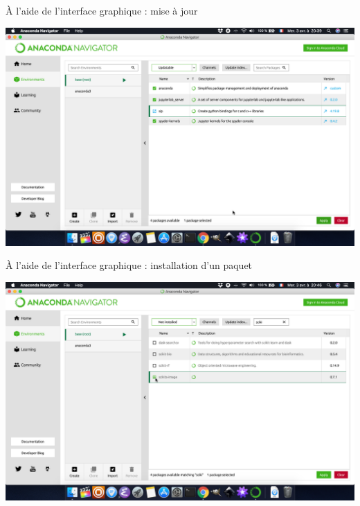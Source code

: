 \documentclass[10pt,aspectratio=169]{beamer}
\begin{document}
\begin{frame}{À l'aide de l'interface graphique : mise à jour}
  \begin{center}
    \includegraphics[height = .8\textheight]{anaconda-navigator-apply-upgrade}
  \end{center}
\end{frame}

\begin{frame}{À l'aide de l'interface graphique : installation d'un paquet}
  \begin{center}
    \includegraphics[height = .8\textheight]{anaconda-navigator-select-package-for-install}
  \end{center}
\end{frame}
\end{document}
